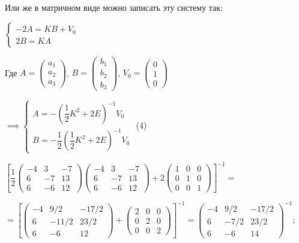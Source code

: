 \documentclass[a4paper, 12pt]{article}
\begin{document}
	\quad Или же в матричном виде можно записать эту систему так:
	
	\begin{center}
		$\begin{cases}
			-2A = KB + V_0 \\
			2B = KA
		\end{cases}$
	\end{center}
	
	\begin{center}
		Где $A = \left( 
		\begin{array}{c}
			a_1 \\
			a_2 \\
			a_3
		\end{array}
		\right)$,  $B= \left( 
		\begin{array}{c}
			b_1 \\
			b_2 \\
			b_3
		\end{array}
		\right)$,  $V_0= \left( 
		\begin{array}{c}
			0 \\
			1 \\
			0
		\end{array}
		\right)$
		
		$\implies 
		\begin{cases}
			A = -(\dfrac{1}{2}K^2 + 2E)^{-1} V_0 \\
			B = -\dfrac{1}{2}(\dfrac{1}{2}K^2 + 2E)^{-1}V_0
		\end{cases}$ (4)
	\end{center}
	
	$\left[
	\dfrac{1}{2}\left(
	\begin{array}{ccc}
		-4 & 3 & -7\\
		6  &-7 & 13 \\
		6 & -6 & 12
	\end{array}
	\right) \left(
	\begin{array}{ccc}
		-4 & 3 & -7\\
		6  &-7 & 13 \\
		6 & -6 & 12
	\end{array}
	\right) + 2\left(
	\begin{array}{ccc}
		1 & 0 & 0\\
		0  &1 & 0 \\
		0 & 0 & 1
	\end{array}
	\right)
	\right]^{-1}	=  $ 
	
	$ = \left[
	\left(
	\begin{array}{ccc}
		-4 & 9/2 & -17/2\\
		6  &-11/2& 23/2 \\
		6 & -6 & 12
	\end{array}
	\right) + \left(
	\begin{array}{ccc}
		2 & 0 & 0\\
		0  &2 & 0 \\
		0 & 0 & 2
	\end{array}
	\right)
	\right]^{-1} = \left(
	\begin{array}{ccc}
		-4 & 9/2 & -17/2\\
		6  &-7/2& 23/2 \\
		6 & -6 & 14
	\end{array}
	\right)^{-1}$;
	
\end{document}
